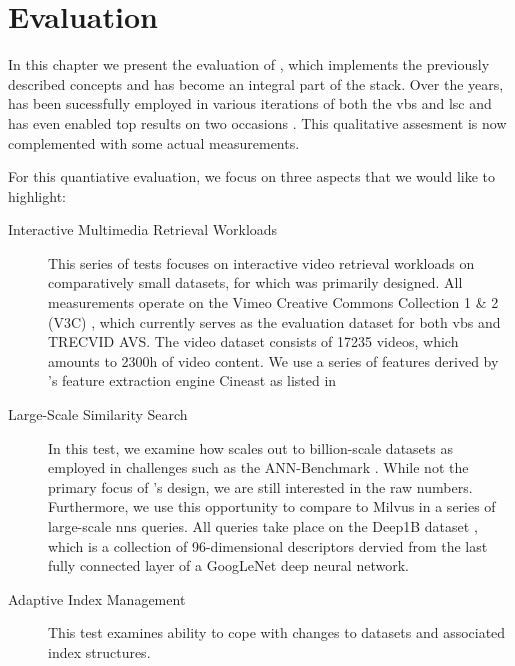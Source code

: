 \chapter{Evaluation}
\label{chapter:evaluation}

In this chapter we present the evaluation of \cottontail{} \cite{Gasser:2020Cottontail}, which implements the previously described concepts and has become an integral part of the \vitrivr{} \cite{Rossetto:2016vitrivr,Gasser:2019Towards,Gasser:2019Multimodal} stack. Over the years, \cottontail{} has been  sucessfully employed in various iterations of both the \acrshort{vbs} and \acrshort{lsc} and has even enabled top results on two occasions \cite{}. This qualitative assesment is now complemented with some actual measurements.

For this quantiative evaluation, we focus on three aspects that we would like to highlight:

\begin{description}
    \item[Interactive Multimedia Retrieval Workloads] This series of tests focuses on interactive video retrieval workloads on comparatively small datasets, for which \cottontail{} was primarily designed. All measurements operate on the Vimeo Creative Commons Collection 1 \& 2 (V3C) \cite{Berns:2019V3C1,Rossetto:2021Insights}, which currently serves as the evaluation dataset for both \acrshort{vbs} and TRECVID AVS. The video dataset consists of 17235 videos, which amounts to 2300h of video content. We use a series of features derived by \vitrivr{}'s feature extraction engine Cineast as listed in 
    \item[Large-Scale Similarity Search] In this test, we examine how \cottontail{} scales out to billion-scale datasets as employed in challenges such as the ANN-Benchmark \cite{Aumueller:2017ANN}. While not the primary focus of \cottontail{}'s design, we are still interested in the raw numbers. Furthermore, we use this opportunity to compare \cottontail{} to Milvus \cite{Wang:2021Milvus} in a series of large-scale \acrshort{nns} queries. All queries take place on the Deep1B dataset \cite{Babenko:2016Efficient}, which is a collection of 96-dimensional descriptors dervied from the last fully connected layer of a GoogLeNet \cite{Szegedy:2015Going} deep neural network.
    \item[Adaptive Index Management] This test examines \cottontail{} ability to cope with changes to datasets and associated index structures.
\end{description}

